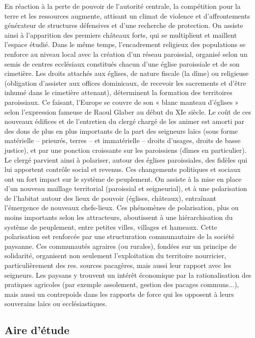 En réaction à la perte de pouvoir de l'autorité centrale, la compétition pour la terre et les ressources augmente, attisant un climat de violence et d'affrontements générateur de structures défensives et d'une recherche de protection.
On assiste ainsi à l'apparition des premiers châteaux forts, qui se multiplient et maillent l'espace étudié.
Dans le même temps, l'encadrement religieux des populations se renforce au niveau local avec la création d'un réseau paroissial, organisé selon un semis de centres ecclésiaux constitués chacun d'une église paroissiale et de son cimetière.
Les droits attachés aux églises, de nature fiscale (la dîme) ou religieuse (obligation d'assister aux offices dominicaux, de recevoir les sacrements et d'être inhumé dans le cimetière attenant), déterminent la formation des territoires paroissiaux.
Ce faisant, l'Europe se couvre de son « blanc manteau d'églises » selon l'expression fameuse de Raoul Glaber au début du XIe siècle.
Le coût de ces nouveaux édifices et de l'entretien du clergé chargé de les animer est amorti par des dons de plus en plus importants de la part des seigneurs laïcs (sous forme matérielle – prieurés, terres – et immatérielle – droits d'usages, droits de basse justice), et par une ponction croissante sur les  paroissiens (dîmes en particulier).
Le clergé parvient ainsi à polariser, autour des églises paroissiales, des fidèles qui lui apportent contrôle social et revenus.
Ces changements politiques et sociaux ont un fort impact sur le système de peuplement.
On assiste à la mise en place d'un nouveau maillage territorial (paroissial et seigneurial), et à une polarisation de l'habitat autour des lieux de pouvoir (églises, châteaux), entraînant l'émergence de nouveaux chefs-lieux.
Ces phénomènes de polarisation, plus ou moins importants selon les attracteurs, aboutissent à une hiérarchisation du système de peuplement, entre petites villes, villages et hameaux.
Cette polarisation est renforcée par une structuration communautaire de la société paysanne.
Ces communautés agraires (ou rurales), fondées sur un principe de solidarité, organisent non seulement l'exploitation du territoire nourricier, particulièrement des res.
sources pacagères, mais aussi leur rapport avec les seigneurs.
Les paysans y trouvent un intérêt économique par la rationalisation des pratiques agricoles (par exemple assolement, gestion des pacages communs...), mais aussi un contrepoids dans les rapports de force qui les opposent à leurs souverains laïcs ou ecclésiastiques.

\subsection{Aire d'étude}	

